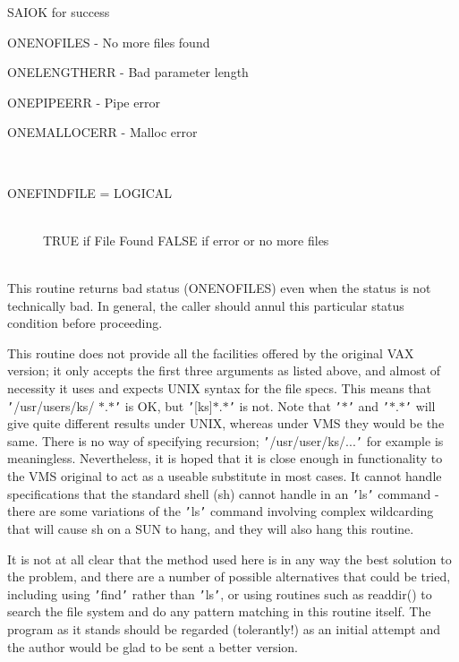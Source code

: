 \documentclass[twoside,11pt]{article}
\renewcommand{\_}{\texttt{\symbol{95}}}
\newcommand{\sstreturnedvalue}[1]{
   \item[Returned Value:] \mbox{} \\
   \vspace{-3.5ex}
   \begin{description}
      #1
   \end{description}
}
\newcommand{\sstsubsection}[1]{ \item[{#1}] \mbox{} \\}
\newcommand{\sstnotes}[1]{\item[Notes:] \mbox{} \\[1.3ex] #1}
\newcommand{\sstbugs}[1]{\item[Bugs:] #1}
\newcommand{\sstitem}{\item}
\newcommand{\sstreturnedvalue}[1]{
      \item[Returned Value:] \\
      \begin{description}
         #1
      \end{description}
      \\
   }
\newcommand{\sstsubsection}[1]{\item[{#1}]}
\newcommand{\sstnotes}[1]{\item[Notes:] #1 }
\newcommand{\sstitem}{\item}
\begin{document}
{{{{            \sstitem
            SAI\_\_OK for success

            \sstitem
            ONE\_\_NOFILES - No more files found

            \sstitem
            ONE\_\_LENGTHERR - Bad parameter length

            \sstitem
            ONE\_\_PIPEERR  - Pipe error

            \sstitem
            ONE\_\_MALLOCERR - Malloc error
         }
      }
   }
   \sstreturnedvalue{
      \sstsubsection{
         ONE\_FIND\_FILE = LOGICAL
      }{
         TRUE if File Found
         FALSE if error or no more files
      }
   }
   \sstnotes{
      This routine returns bad status (ONE\_\_NOFILES) even when the
      status is not technically bad. In general, the caller should
      annul this particular status condition before proceeding.
   }
   \sstbugs{
      This routine does not provide all the facilities offered by the
      original VAX version; it only accepts the first three arguments as
      listed above, and almost of necessity it uses and expects UNIX syntax
      for the file specs.  This means that {\tt '}/usr/users/ks/ $*$.$*${\tt '} is OK, but
      {\tt '}[ks]$*$.$*${\tt '} is not. Note that {\tt '}$*${\tt '} and {\tt '}$*$.$*${\tt '} will give quite different
      results under UNIX, whereas under VMS they would be the same. There
      is no way of specifying recursion; {\tt '}/usr/user/ks/...{\tt '} for example
      is meaningless. Nevertheless, it is hoped that it is close enough in
      functionality to the VMS original to act as a useable substitute in
      most cases. It cannot handle specifications that the standard shell
      (sh) cannot handle in an {\tt '}ls{\tt '} command - there are some variations of
      the {\tt '}ls{\tt '} command involving complex wildcarding that will cause sh
      on a SUN to hang, and they will also hang this routine.

      It is not at all clear that the method used here is  in any way
      the best solution to the problem, and there are a number of possible
      alternatives that could be tried, including using {\tt '}find{\tt '} rather than
      {\tt '}ls{\tt '}, or using routines such as readdir() to search the file system
      and do any pattern matching in this routine itself. The program as it
      stands should be regarded (tolerantly!) as an initial attempt and
      the author would be glad to be sent a better version.
   }
}
\end{document}
